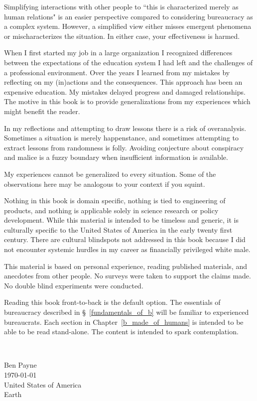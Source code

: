 Simplifying interactions with other people to ``this is characterized merely as human relations" is an easier perspective compared to considering bureaucracy as a complex system. 
However, a simplified view either misses emergent phenomena or mischaracterizes the situation. In either case, your effectiveness is harmed.



 When I first started my job in a large organization I recognized differences between the expectations of the education system I had left and the challenges of a professional environment. Over the years I learned from my mistakes by reflecting on my (in)actions and the consequences. This approach has been an expensive education. My mistakes delayed progress and damaged relationships. The motive in this book is to provide generalizations from my experiences which might benefit the reader.



In my reflections and attempting to draw lessons there is a risk of overanalysis. Sometimes a situation is merely happenstance, and sometimes attempting to extract lessons from randomness is folly. Avoiding conjecture about conspiracy and malice is a fuzzy boundary when insufficient information is available. 

My experiences cannot be generalized to every situation. Some of the observations here may be analogous to your context if you squint. 

Nothing in this book is domain specific, nothing is tied to engineering of products, and nothing is applicable solely in science research or policy development. While this material is intended to be timeless and generic, it is culturally specific to the United States of America in the early twenty first century. There are cultural blindspots not addressed in this book because I did not encounter systemic hurdles in my career as financially privileged white male. 

This material is based on personal experience, reading published materials, and anecdotes from other people. No surveys were taken to support the claims made. No double blind experiments were conducted. 

Reading this book front-to-back is the default option. 
The essentials of bureaucracy described in \S~\ref{fundamentals_of_b} will be familiar to experienced bureaucrats. Each section in Chapter~\ref{b_made_of_humans} is intended to be able to be read stand-alone. The content is intended to spark contemplation. 

\ \\

\begin{flushright}
Ben Payne\\
\today\\
United States of America\\
Earth
\end{flushright}


